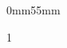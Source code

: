 \documentclass[14pt]{../../inc/mybib}
\author{ESRA-BIBEL}
\newcommand{\mySpacing}{1}
\newcommand{\myRight}{55mm}
\begin{document}
\tableofcontents
\begin{adjustwidth*}{0mm}{\myRight} %
    \leavevmode
    \begin{spacing}{\mySpacing} 
          
            
      
       
      
    \end{spacing}
\end{adjustwidth*}
\end{document}
